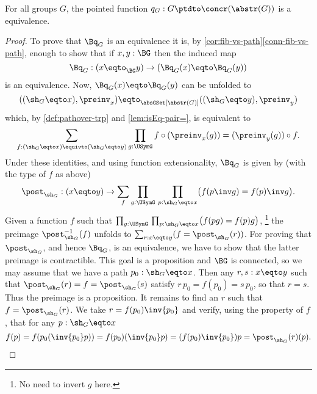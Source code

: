 \begin{lemma}
  \label{lem:Groupsareidentitytypes}
For all groups $G$, the pointed function $q_G:G\ptdto\concr(\abstr(G))$
is a  equivalence.
\end{lemma}
\begin{proof}
  To prove that $\Bq_G$ is an equivalence it is, by \cref{cor:fib-vs-path}\ref{conn-fib-vs-path}, enough to show that if $x,y:\BG$ then the induced map
$$\Bq_G:(x\eqto_{\BG}y)\to (\Bq_G(x)\eqto \Bq_G(y))
$$
is an equivalence.
  Now, $\Bq_G(x)\eqto \Bq_G(y)$ can be unfolded to
$$
((\sh_G\eqto x),\preinv_x)\eqto_{\absGSet[\abstr(G)]}((\sh_G\eqto y),\preinv_y)$$
which, by \cref{def:pathover-trp} and \cref{lem:isEq-pair=}, is equivalent to
\[
\sum_{f:(\sh_G\eqto x)\equivto (\sh_G\eqto y)}
\prod_{g:\USymG} f\circ(\preinv_x(g))=(\preinv_y(g))\circ f.
\]
Under these identities, and using function extensionality,
$\Bq_G$ is given by (with the type of $f$ as above)
\[
\post_{\sh_G}:(x\eqto y)\to \sum_{f}
\prod_{g:\USymG}\,\prod_{p:\sh_G\eqto x}\bigl(f(p\inv g)= f(p)\inv g\bigr).
\]
Given a function $f$ such that
$\prod_{g:\USymG}\,\prod_{p:\sh_G\eqto x}\bigl(f(pg)= f(p)g\bigr)$,%
\footnote{No need to invert $g$ here.}
the preimage $\post_{\sh_G}^{-1}(f)$ unfolds to
$\sum_{r:x\eqto y}(f=\post_{\sh_G}(r))$. For proving that $\post_{\sh_G}$,
and hence $\Bq_G$, is an equivalence, we have to show that the
latter preimage is contractible. This goal is a proposition
and $\BG$ is connected, so we may assume that we have a 
path $p_0:\sh_G\eqto x$. Then any $r,s:x\eqto y$ such that
$\post_{\sh_G}(r)= f=\post_{\sh_G}(s)$ satisfy $r\,p_0=f(p_0)=s\,p_0$,
so that $r=s$. Thus the preimage is a proposition. It remains
to find an $r$ such that $f=\post_{\sh_G}(r)$. 
We take $r=f(p_0)\inv{p_0}$ and verify, using
the property of $f$, that for any $p:\sh_G\eqto x$
\[
f(p) = f(p_0(\inv{p_0}p)) = f(p_0)(\inv{p_0} p) = (f(p_0) \inv{p_0}) p
= \post_{\sh_G}(r)(p).\qedhere
\]
\end{proof}


